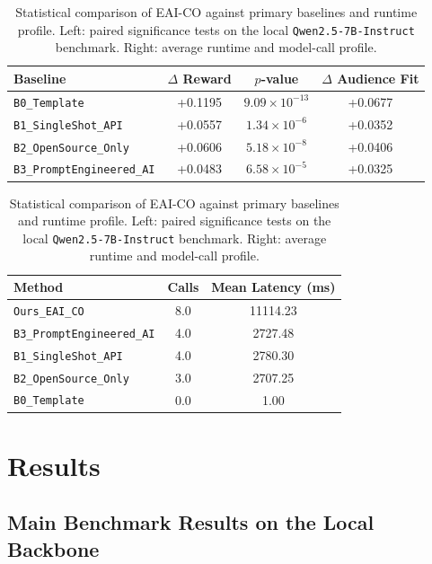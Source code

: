 \documentclass[applsci,article,submit,pdftex,moreauthors]{Definitions/mdpi}
\begin{document}
\begin{table}[t]
\centering
\caption{Statistical comparison of EAI-CO against primary baselines and runtime profile. Left: paired significance tests on the local \texttt{Qwen2.5-7B-Instruct} benchmark. Right: average runtime and model-call profile.}
\label{tab:significance_cost}
\begin{minipage}[t]{0.60\textwidth}
\centering
\begin{threeparttable}
\begin{tabular}{lccc}
\toprule
Baseline & $\Delta$ Reward & $p$-value & $\Delta$ Audience Fit \\
\midrule
\texttt{B0\_Template} & +0.1195 & $9.09\times10^{-13}$ & +0.0677 \\
\texttt{B1\_SingleShot\_API} & +0.0557 & $1.34\times10^{-6}$ & +0.0352 \\
\texttt{B2\_OpenSource\_Only} & +0.0606 & $5.18\times10^{-8}$ & +0.0406 \\
\texttt{B3\_PromptEngineered\_AI} & +0.0483 & $6.58\times10^{-5}$ & +0.0325 \\
\bottomrule
\end{tabular}
\end{threeparttable}
\end{minipage}
\hfill
\begin{minipage}[t]{0.36\textwidth}
\centering
\begin{threeparttable}
\begin{tabular}{lcc}
\toprule
Method & Calls & Mean Latency (ms) \\
\midrule
\texttt{Ours\_EAI\_CO} & 8.0 & 11114.23 \\
\texttt{B3\_PromptEngineered\_AI} & 4.0 & 2727.48 \\
\texttt{B1\_SingleShot\_API} & 4.0 & 2780.30 \\
\texttt{B2\_OpenSource\_Only} & 3.0 & 2707.25 \\
\texttt{B0\_Template} & 0.0 & 1.00 \\
\bottomrule
\end{tabular}
\end{threeparttable}
\end{minipage}
\end{table}

\section{Results}

\subsection{Main Benchmark Results on the Local Backbone}
\end{document}

